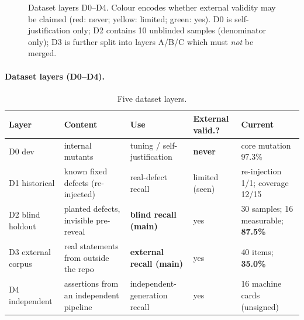 \documentclass{article}
\begin{document}
\begin{figure}[t]
\centering
{}
\caption{Dataset layers D0--D4. Colour encodes whether external validity may be claimed
(red: never; yellow: limited; green: yes). D0 is self-justification only; D2 contains 10 unblinded
samples (denominator only); D3 is further split into layers A/B/C which must \emph{not} be merged.}
\label{fig:data}
\end{figure}

\paragraph{Dataset layers (D0--D4).}
\begin{table}[t]
\caption{Five dataset layers.}
\label{tab:data}
\centering
\small
\begin{tabular}{@{}lp{3.4cm}p{3.2cm}p{2.4cm}p{3.4cm}@{}}
\toprule
Layer & Content & Use & External valid.? & Current \\
\midrule
D0 dev & internal mutants & tuning / self-justification & \textbf{never} & core mutation 97.3\% \\
D1 historical & known fixed defects (re-injected) & real-defect recall & limited (seen) & re-injection 1/1; coverage 12/15 \\
D2 blind holdout & planted defects, invisible pre-reveal & \textbf{blind recall (main)} & yes & 30 samples; 16 measurable; \textbf{87.5\%} \\
D3 external corpus & real statements from outside the repo & \textbf{external recall (main)} & yes & 40 items; \textbf{35.0\%} \\
D4 independent & assertions from an independent pipeline & independent-generation recall & yes & 16 machine cards (unsigned) \\
\bottomrule
\end{tabular}
\end{table}
\end{document}
